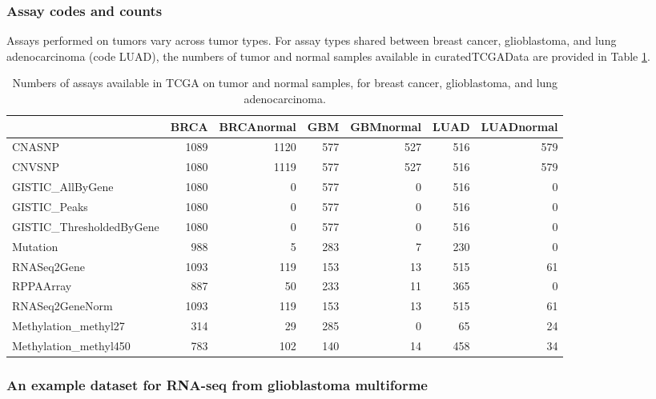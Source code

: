 \documentclass[]{article}
\begin{document}
\hypertarget{assay-codes-and-counts}{%
\subsubsection{Assay codes and counts}\label{assay-codes-and-counts}}

Assays performed on tumors vary across tumor types. For assay
types shared between
breast cancer, glioblastoma, and lung adenocarcinoma (code LUAD),
the numbers of tumor and normal samples available in curatedTCGAData
are provided in Table \ref{tab:tab-doassc}.

\begin{table}

\caption{\label{tab:tab-doassc}Numbers of assays available in TCGA on tumor and normal samples,
for breast cancer, glioblastoma, and lung adenocarcinoma.}
\centering
\begin{tabular}[t]{lrrrrrr}
\toprule
  & BRCA & BRCAnormal & GBM & GBMnormal & LUAD & LUADnormal\\
\midrule
CNASNP & 1089 & 1120 & 577 & 527 & 516 & 579\\
CNVSNP & 1080 & 1119 & 577 & 527 & 516 & 579\\
GISTIC\_AllByGene & 1080 & 0 & 577 & 0 & 516 & 0\\
GISTIC\_Peaks & 1080 & 0 & 577 & 0 & 516 & 0\\
GISTIC\_ThresholdedByGene & 1080 & 0 & 577 & 0 & 516 & 0\\
\addlinespace
Mutation & 988 & 5 & 283 & 7 & 230 & 0\\
RNASeq2Gene & 1093 & 119 & 153 & 13 & 515 & 61\\
RPPAArray & 887 & 50 & 233 & 11 & 365 & 0\\
RNASeq2GeneNorm & 1093 & 119 & 153 & 13 & 515 & 61\\
Methylation\_methyl27 & 314 & 29 & 285 & 0 & 65 & 24\\
\addlinespace
Methylation\_methyl450 & 783 & 102 & 140 & 14 & 458 & 34\\
\bottomrule
\end{tabular}
\end{table}

\hypertarget{an-example-dataset-for-rna-seq-from-glioblastoma-multiforme}{%
\subsubsection{An example dataset for RNA-seq from glioblastoma multiforme}\label{an-example-dataset-for-rna-seq-from-glioblastoma-multiforme}}
\end{document}
